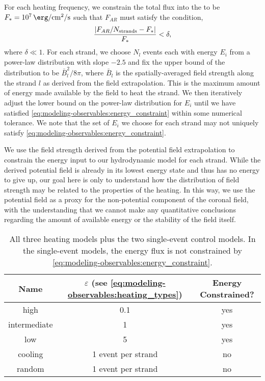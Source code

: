For each heating frequency, we constrain the total flux into the \AR{} to be $F_{\ast}=\SI{e7}{\erg\per\square\cm\per\second}$ \citep{withbroe_mass_1977} such that $F_{AR}$ must satisfy the condition,
\begin{equation}\label{eq:modeling-observables:energy_constraint}
    \frac{| F_{AR}/N_\textup{strands} - F_{\ast} |}{F_{\ast}} < \delta,
\end{equation}
where $\delta\ll1$. For each strand, we choose $N_l$ events each with energy $E_i$ from a power-law distribution with slope $-2.5$ and fix the upper bound of the distribution to be $\bar{B}_l^2/8\pi$, where $\bar{B}_l$ is the spatially-averaged field strength along the strand $l$ as derived from the field extrapolation. This is the maximum amount of energy made available by the field to heat the strand. We then iteratively adjust the lower bound on the power-law distribution for $E_i$ until we have satisfied \autoref{eq:modeling-observables:energy_constraint} within some numerical tolerance. We note that the set of $E_i$ we choose for each strand may not uniquely satisfy \autoref{eq:modeling-observables:energy_constraint}.

We use the field strength derived from the potential field extrapolation to constrain the energy input to our hydrodynamic model for each strand. While the derived potential field is already in its lowest energy state and thus has no energy to give up, our goal here is only to understand how the distribution of field strength may be related to the properties of the heating. In this way, we use the potential field as a proxy for the non-potential component of the coronal field, with the understanding that we cannot make any quantitative conclusions regarding the amount of available energy or the stability of the field itself.

\begin{table}
    \centering
    \caption{All three heating models plus the two single-event control models. In the single-event models, the energy flux is not constrained by \autoref{eq:modeling-observables:energy_constraint}.\label{tab:modeling-observables:heating}}
    \begin{tabularx}{\columnwidth}{CCC}
        \toprule
        Name & $\varepsilon$ (see \autoref{eq:modeling-observables:heating_types}) & Energy Constrained? \\
        \midrule
        high & 0.1 & yes \\
        intermediate & 1 & yes \\
        low & 5 & yes \\
        cooling & 1 event per strand & no \\
        random & 1 event per strand & no \\
        \bottomrule
    \end{tabularx}
\end{table}

